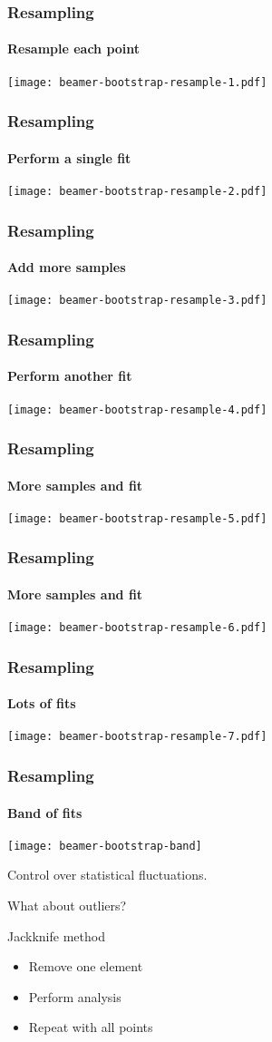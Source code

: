 \documentclass[english, fleqn]{beamer}
\begin{document}
\begin{frame}
    \frametitle{Resampling}
    \framesubtitle{Resample each point}
    \centering
    \texttt{[image: beamer-bootstrap-resample-1.pdf]}
\end{frame}

\begin{frame}
    \frametitle{Resampling}
    \framesubtitle{Perform a single fit}
    \centering
    \texttt{[image: beamer-bootstrap-resample-2.pdf]}
\end{frame}

\begin{frame}
    \frametitle{Resampling}
    \framesubtitle{Add more samples}
    \centering
    \texttt{[image: beamer-bootstrap-resample-3.pdf]}
\end{frame}

\begin{frame}
    \frametitle{Resampling}
    \framesubtitle{Perform another fit}
    \centering
    \texttt{[image: beamer-bootstrap-resample-4.pdf]}
\end{frame}

\begin{frame}
    \frametitle{Resampling}
    \framesubtitle{More samples and fit}
    \centering
    \texttt{[image: beamer-bootstrap-resample-5.pdf]}
\end{frame}

\begin{frame}
    \frametitle{Resampling}
    \framesubtitle{More samples and fit}
    \centering
    \texttt{[image: beamer-bootstrap-resample-6.pdf]}
\end{frame}

\begin{frame}
    \frametitle{Resampling}
    \framesubtitle{Lots of fits}
    \centering
    \texttt{[image: beamer-bootstrap-resample-7.pdf]}
\end{frame}

\begin{frame}
    \frametitle{Resampling}
    \framesubtitle{Band of fits}
    \centering
    \texttt{[image: beamer-bootstrap-band]}
\end{frame}

\begin{frame}
    Control over statistical fluctuations.

    \pause

    \alert{What about outliers?}

    \pause

    \begin{block}{Jackknife method}
        \begin{itemize}
            \item Remove one element
            \item Perform analysis
            \item Repeat with all points
        \end{itemize}
    \end{block}
\end{frame}
\end{document}
